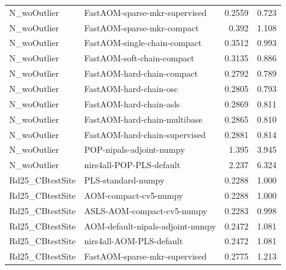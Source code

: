 \begin{landscape}
\begin{longtable}{L{8.0cm}L{9.5cm}rr}
N\_\allowbreak{}woOutlier & FastAOM-\allowbreak{}sparse-\allowbreak{}mkr-\allowbreak{}supervised & 0.2559 & 0.723 \\
N\_\allowbreak{}woOutlier & FastAOM-\allowbreak{}sparse-\allowbreak{}mkr-\allowbreak{}compact & 0.392 & 1.108 \\
N\_\allowbreak{}woOutlier & FastAOM-\allowbreak{}single-\allowbreak{}chain-\allowbreak{}compact & 0.3512 & 0.993 \\
N\_\allowbreak{}woOutlier & FastAOM-\allowbreak{}soft-\allowbreak{}chain-\allowbreak{}compact & 0.3135 & 0.886 \\
N\_\allowbreak{}woOutlier & FastAOM-\allowbreak{}hard-\allowbreak{}chain-\allowbreak{}compact & 0.2792 & 0.789 \\
N\_\allowbreak{}woOutlier & FastAOM-\allowbreak{}hard-\allowbreak{}chain-\allowbreak{}osc & 0.2805 & 0.793 \\
N\_\allowbreak{}woOutlier & FastAOM-\allowbreak{}hard-\allowbreak{}chain-\allowbreak{}asls & 0.2869 & 0.811 \\
N\_\allowbreak{}woOutlier & FastAOM-\allowbreak{}hard-\allowbreak{}chain-\allowbreak{}multibase & 0.2865 & 0.810 \\
N\_\allowbreak{}woOutlier & FastAOM-\allowbreak{}hard-\allowbreak{}chain-\allowbreak{}supervised & 0.2881 & 0.814 \\
N\_\allowbreak{}woOutlier & POP-\allowbreak{}nipals-\allowbreak{}adjoint-\allowbreak{}numpy & 1.395 & 3.945 \\
N\_\allowbreak{}woOutlier & nirs4all-\allowbreak{}POP-\allowbreak{}PLS-\allowbreak{}default & 2.237 & 6.324 \\
Rd25\_\allowbreak{}CBtestSite & PLS-\allowbreak{}standard-\allowbreak{}numpy & 0.2288 & 1.000 \\
Rd25\_\allowbreak{}CBtestSite & AOM-\allowbreak{}compact-\allowbreak{}cv5-\allowbreak{}numpy & 0.2288 & 1.000 \\
Rd25\_\allowbreak{}CBtestSite & ASLS-\allowbreak{}AOM-\allowbreak{}compact-\allowbreak{}cv5-\allowbreak{}numpy & 0.2283 & 0.998 \\
Rd25\_\allowbreak{}CBtestSite & AOM-\allowbreak{}default-\allowbreak{}nipals-\allowbreak{}adjoint-\allowbreak{}numpy & 0.2472 & 1.081 \\
Rd25\_\allowbreak{}CBtestSite & nirs4all-\allowbreak{}AOM-\allowbreak{}PLS-\allowbreak{}default & 0.2472 & 1.081 \\
Rd25\_\allowbreak{}CBtestSite & FastAOM-\allowbreak{}sparse-\allowbreak{}mkr-\allowbreak{}supervised & 0.2775 & 1.213 \\

\end{longtable}
\end{landscape}
